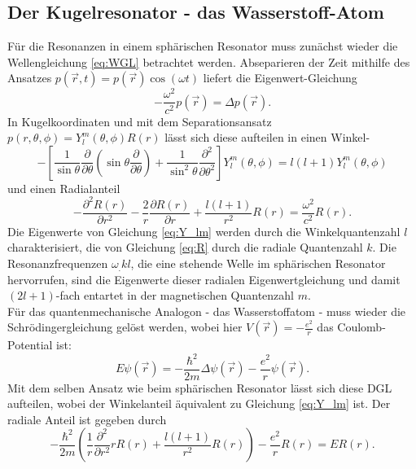 \subsection{Der Kugelresonator - das Wasserstoff-Atom}
Für die Resonanzen in einem sphärischen Resonator muss zunächst wieder die Wellengleichung \eqref{eq:WGL} betrachtet werden. Abseparieren der Zeit mithilfe des Ansatzes $p(\vec{r},t)=p(\vec{r})\cos{(\omega t)}$ liefert die Eigenwert-Gleichung
\begin{equation*}
-\frac{\omega^2}{c^2}p(\vec{r})=\Delta p(\vec{r})\text{.}
\end{equation*}
In Kugelkoordinaten und mit dem Separationsansatz $p(r,\theta,\phi)=Y^m_l(\theta,\phi)R(r)$ lässt sich diese aufteilen in einen Winkel-
\begin{equation}
-\left[\frac{1}{\sin{\theta}}\frac{\partial}{\partial\theta}\left(\sin{\theta}\frac{\partial}{\partial\theta}\right)+\frac{1}{\sin^2{\theta}}\frac{\partial^2}{\partial\theta^2}\right]Y^m_l(\theta,\phi)=l(l+1)Y^m_l(\theta,\phi)\label{eq:Y_lm}
\end{equation}
und einen Radialanteil 
\begin{equation}
-\frac{\partial^2 R(r)}{\partial r^2}-\frac{2}{r}\frac{\partial R(r)}{\partial r}+\frac{l(l+1)}{r^2}R(r)=\frac{\omega^2}{c^2}R(r)\text{.}\label{eq:R}
\end{equation}
Die Eigenwerte von Gleichung \eqref{eq:Y_lm} werden durch die Winkelquantenzahl $l$ charakterisiert, die von Gleichung \eqref{eq:R} durch die radiale Quantenzahl $k$. Die Resonanzfrequenzen $\omega_.{k l}$, die eine stehende Welle im sphärischen Resonator hervorrufen, sind die Eigenwerte dieser radialen Eigenwertgleichung und damit $(2l+1)$-fach entartet in der magnetischen Quantenzahl $m$.\\
\newline
Für das quantenmechanische Analogon - das Wasserstoffatom - muss wieder die Schrödingergleichung gelöst werden, wobei hier $V(\vec{r})=-\frac{e^2}{r}$ das Coulomb-Potential ist:
\[
E\psi(\vec{r})=-\frac{\hbar^2}{2m}\Delta\psi(\vec{r})-\frac{e^2}{r}\psi(\vec{r})\text{.}
\]
Mit dem selben Ansatz wie beim sphärischen Resonator lässt sich diese DGL aufteilen, wobei der Winkelanteil äquivalent zu Gleichung \eqref{eq:Y_lm} ist. Der radiale Anteil ist gegeben durch 
\begin{equation}
-\frac{\hbar^2}{2m}\left(\frac{1}{r}\frac{\partial^2}{\partial r^2}r R(r)+\frac{l(l+1)}{r^2}R(r)\right)-\frac{e^2}{r}R(r)=E R(r)\text{.}\label{eq:R2}
\end{equation}
